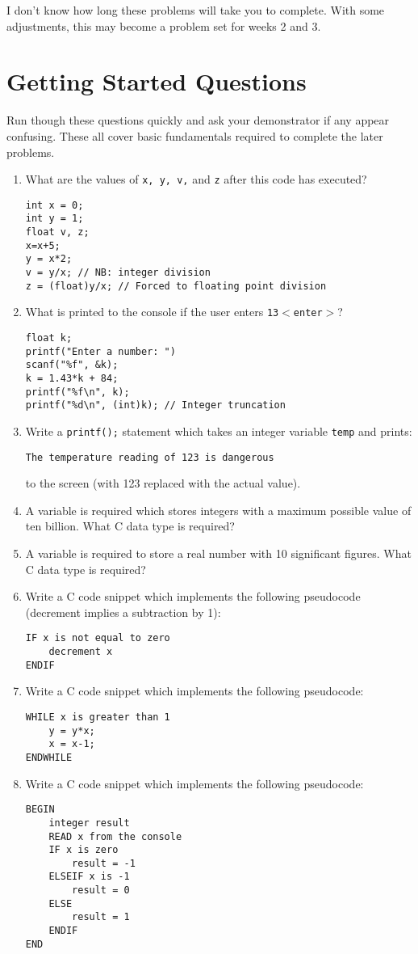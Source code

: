 \documentclass{lab}
\begin{document}
I don't know how long these problems will take you to complete. With some adjustments, this may become a problem set for weeks 2 and 3.
\pagebreak
\section{Getting Started Questions}

Run though these questions quickly and ask your demonstrator if any appear confusing. These all cover basic fundamentals required to complete the later problems.

\begin{enumerate}
\item What are the values of \texttt{x, y, v,} and \texttt{z} after this code has executed?
\begin{lstlisting}[style=CStyle]
int x = 0;
int y = 1;
float v, z;
x=x+5;
y = x*2;
v = y/x; // NB: integer division
z = (float)y/x; // Forced to floating point division
\end{lstlisting}
\item What is printed to the console if the user enters \texttt{13$<$enter$>$}?
\begin{lstlisting}[style=CStyle]
float k;
printf("Enter a number: ")
scanf("%f", &k);
k = 1.43*k + 84;
printf("%f\n", k);
printf("%d\n", (int)k); // Integer truncation
\end{lstlisting}
\item Write a \texttt{printf();} statement which takes an integer variable \texttt{temp} and prints:

\texttt{The temperature reading of 123 is dangerous}

to the screen (with 123 replaced with the actual value).
\item A variable is required which stores integers with a maximum possible value of ten billion. What C data type is required?
\item A variable is required to store a real number with 10 significant figures. What C data type is required?
\item Write a C code snippet which implements the following pseudocode (decrement implies a subtraction by 1):
\begin{lstlisting}[style=pseudo]
IF x is not equal to zero
	decrement x
ENDIF
\end{lstlisting}
 
\item Write a C code snippet which implements the following pseudocode:
\begin{lstlisting}[style=pseudo]
WHILE x is greater than 1
	y = y*x;
	x = x-1;
ENDWHILE
\end{lstlisting}
\item Write a C code snippet which implements the following pseudocode:
\begin{lstlisting}[style=pseudo]
BEGIN
	integer result
	READ x from the console
	IF x is zero
		result = -1
	ELSEIF x is -1
		result = 0
	ELSE
		result = 1
	ENDIF
END
\end{lstlisting}
\end{enumerate}
\end{document}
